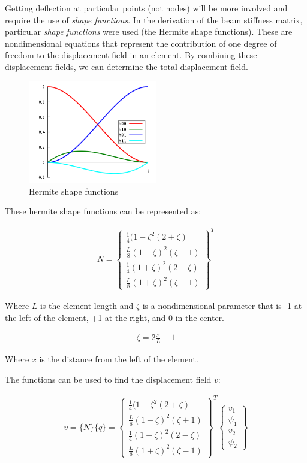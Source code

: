 \documentclass[10pt,letterpaper]{article}
\begin{document}
	Getting deflection at particular points (not nodes) will be more involved and require the use of \textit{shape functions}. In the derivation of the beam stiffness matrix, particular \textit{shape functions} were used (the Hermite shape functions). These are nondimensional equations that represent the contribution of one degree of freedom to the displacement field in an element. By combining these displacement fields, we can determine the total displacement field.

	\begin{figure}[H]
		\includegraphics[width=0.5\textwidth]{hermite.png}
		\caption{Hermite shape functions}
	\end{figure}

	These hermite shape functions can be represented as:

	\begin{align}
		N = \begin{Bmatrix}
				\frac{1}{4} (1-\zeta^2 (2+\zeta) \\
				\frac{L}{8} (1-\zeta)^2 (\zeta+1) \\
				\frac{1}{4} (1+\zeta)^2 (2-\zeta) \\
				\frac{L}{8} (1+\zeta)^2 (\zeta-1) 
		\end{Bmatrix}^T
	\end{align}

	Where $L$ is the element length and $\zeta$ is a nondimensional parameter that is -1 at the left of the element, +1 at the right, and 0 in the center.

	\begin{align}
		\zeta = 2 \frac{x}{L} - 1
	\end{align}

	Where $x$ is the distance from the left of the element.

	The functions can be used to find the displacement field $v$:

	\begin{align}
		v = \{N\} \{q\} =
		\begin{Bmatrix}
				\frac{1}{4} (1-\zeta^2 (2+\zeta) \\
				\frac{L}{8} (1-\zeta)^2 (\zeta+1) \\
				\frac{1}{4} (1+\zeta)^2 (2-\zeta) \\
				\frac{L}{8} (1+\zeta)^2 (\zeta-1) 
		\end{Bmatrix}^T 
		\begin{Bmatrix}
			v_1 \\
			\psi_1 \\
			v_2 \\
			\psi_2 
		\end{Bmatrix}
	\end{align}
\end{document}
